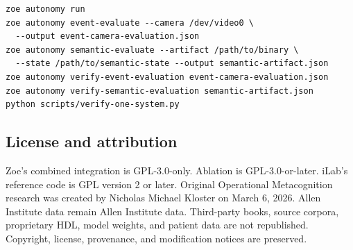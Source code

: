 \documentclass[11pt]{article}
\begin{document}
\begin{lstlisting}
zoe autonomy run
zoe autonomy event-evaluate --camera /dev/video0 \
  --output event-camera-evaluation.json
zoe autonomy semantic-evaluate --artifact /path/to/binary \
  --state /path/to/semantic-state --output semantic-artifact.json
zoe autonomy verify-event-evaluation event-camera-evaluation.json
zoe autonomy verify-semantic-evaluation semantic-artifact.json
python scripts/verify-one-system.py
\end{lstlisting}

\subsection{License and attribution}

Zoe's combined integration is GPL-3.0-only. Ablation is GPL-3.0-or-later. iLab's reference code is GPL version 2 or later. Original Operational Metacognition research was created by Nicholas Michael Kloster on March 6, 2026. Allen Institute data remain Allen Institute data. Third-party books, source corpora, proprietary HDL, model weights, and patient data are not republished. Copyright, license, provenance, and modification notices are preserved.
\end{document}
